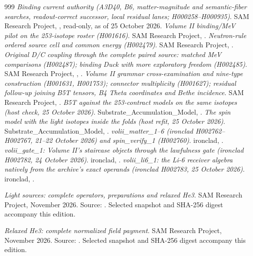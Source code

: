 \begin{thebibliography}{999}
 \emph{Binding current authority (A3D40, B6, matter-magnitude and semantic-fiber searches, readout-correct successor, local residual lanes; H000258--H000935)}. SAM Research Project, , read-only, as of 25 October 2026.
 \emph{Volume II binding/MeV pilot on the 253-isotope roster (H001616)}. SAM Research Project, .
 \emph{Neutron-rule ordered source cell and common energy (H002479)}. SAM Research Project, .
 \emph{Original D/C coupling through the complete paired source: matched MeV comparisons (H002487); binding Duck with more exploratory freedom (H002485)}. SAM Research Project, , .
 \emph{Volume II grammar cross-examination and nine-type construction (H001631, H001753); connector multiplicity (H001627); residual follow-up joining B5T tensors, B4 Theta coordinates and Bethe incidence}. SAM Research Project, .
 \emph{B5T against the 253-contract models on the same isotopes (host check, 25 October 2026)}. Substrate\_Accumulation\_Model, .
 \emph{The spin model with the light isotopes inside the folds (host refit, 25 October 2026)}. Substrate\_Accumulation\_Model, .
 \emph{volii\_matter\_1--6 (ironclad H002762--H002767, 21--22 October 2026) and spin\_verify\_1 (H002760)}. ironclad, .
 \emph{volii\_gate\_1: Volume II's staircase objects through the lawfulness gate (ironclad H002782, 24 October 2026)}. ironclad, .
 \emph{volii\_li6\_1: the Li-6 receiver algebra natively from the archive's exact operands (ironclad H002783, 25 October 2026)}. ironclad, .

\emph{Light sources: complete operators, preparations and relaxed He3}. SAM Research Project, November 2026.
Source: . Selected snapshot and SHA-256 digest accompany this edition.

\emph{Relaxed He3: complete normalized field payment}. SAM Research Project, November 2026.
Source: . Selected snapshot and SHA-256 digest accompany this edition.


\end{thebibliography}
